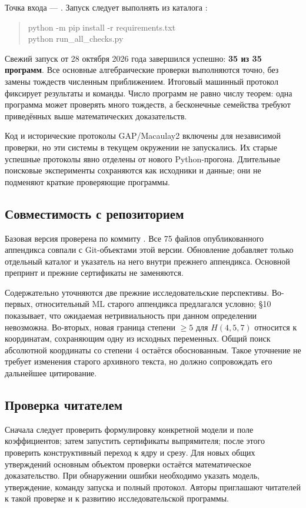 Точка входа --- .
Запуск следует выполнять из каталога :
\begin{quote}\ttfamily\small
python -m pip install -r requirements.txt\\
python run\_all\_checks.py
\end{quote}
Свежий запуск от 28 октября 2026 года завершился успешно: \textbf{35 из 35
программ}. Все основные алгебраические проверки выполняются точно, без замены
тождеств численным приближением. Итоговый машинный протокол
 фиксирует результаты и команды.
Число программ не равно числу теорем: одна программа может проверять
много тождеств, а бесконечные семейства требуют приведённых выше
математических доказательств.

Код и исторические протоколы GAP/Macaulay2 включены для независимой
проверки, но эти системы в текущем окружении не запускались.
Их старые успешные протоколы явно отделены от нового Python-прогона.
Длительные поисковые эксперименты сохраняются как исходники и данные;
они не подменяют краткие проверяющие программы.

\subsection*{Совместимость с репозиторием}
Базовая версия проверена по коммиту
.
Все 75 файлов опубликованного аппендикса совпали с Git-объектами этой
версии. Обновление добавляет только отдельный каталог
 и указатель на него внутри прежнего
аппендикса. Основной препринт и прежние сертификаты не заменяются.

Содержательно уточняются две прежние исследовательские перспективы.
Во-первых, относительный ML старого аппендикса предлагался условно;
\S10 показывает, что ожидаемая нетривиальность при данном определении
невозможна. Во-вторых, новая граница степени $\ge5$ для $H(4,5,7)$
относится к координатам, сохраняющим одну из исходных переменных.
Общий поиск абсолютной координаты со степени $4$ остаётся обоснованным.
Такое уточнение не требует изменения старого архивного текста,
но должно сопровождать его дальнейшее цитирование.

\subsection*{Проверка читателем}
Сначала следует проверить формулировку конкретной модели и поле
коэффициентов; затем запустить сертификаты выпрямителя; после этого
проверить конструктивный переход к ядру и срезу. Для новых общих
утверждений основным объектом проверки остаётся математическое
доказательство. При обнаружении ошибки необходимо указать модель,
утверждение, команду запуска и полный протокол. Авторы приглашают
читателей к такой проверке и к развитию исследовательской программы.
